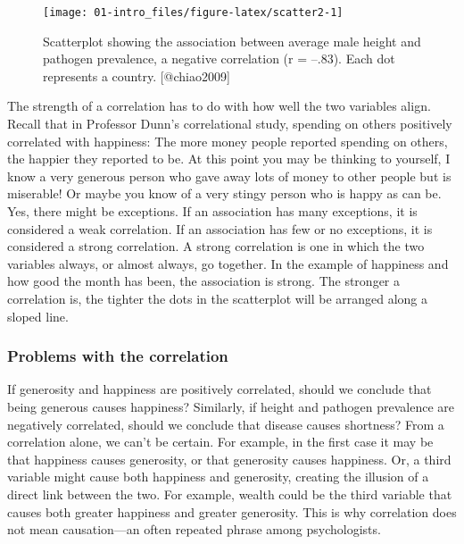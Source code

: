\documentclass[
]{krantz}
\begin{document}
\begin{figure}

{\centering \texttt{[image: 01-intro\_files/figure-latex/scatter2-1]} 

}

\caption{Scatterplot showing the association between average male height and pathogen prevalence, a negative correlation (r = –.83). Each dot represents a country. [@chiao2009]}\label{fig:scatter2}
\end{figure}

The strength of a correlation has to do with how well the two variables align. Recall that in Professor Dunn's correlational study, spending on others positively correlated with happiness: The more money people reported spending on others, the happier they reported to be. At this point you may be thinking to yourself, I know a very generous person who gave away lots of money to other people but is miserable! Or maybe you know of a very stingy person who is happy as can be. Yes, there might be exceptions. If an association has many exceptions, it is considered a weak correlation. If an association has few or no exceptions, it is considered a strong correlation. A strong correlation is one in which the two variables always, or almost always, go together. In the example of happiness and how good the month has been, the association is strong. The stronger a correlation is, the tighter the dots in the scatterplot will be arranged along a sloped line.

\hypertarget{problems-with-the-correlation}{%
\subsubsection*{Problems with the correlation}\label{problems-with-the-correlation}}


If generosity and happiness are positively correlated, should we conclude that being generous causes happiness? Similarly, if height and pathogen prevalence are negatively correlated, should we conclude that disease causes shortness? From a correlation alone, we can't be certain. For example, in the first case it may be that happiness causes generosity, or that generosity causes happiness. Or, a third variable might cause both happiness and generosity, creating the illusion of a direct link between the two. For example, wealth could be the third variable that causes both greater happiness and greater generosity. This is why correlation does not mean causation---an often repeated phrase among psychologists.
\end{document}
